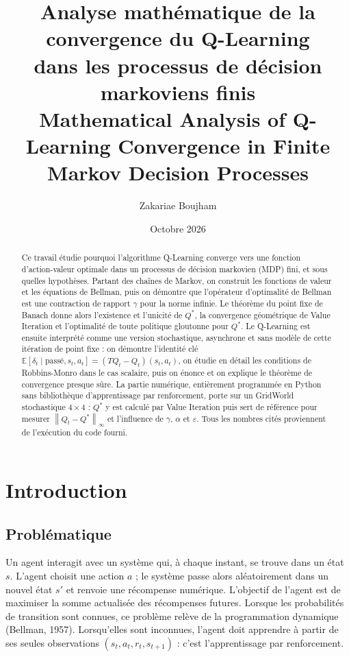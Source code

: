 \documentclass[11pt,a4paper]{article}
\title{\textbf{Analyse mathématique de la convergence du Q-Learning\\ dans les processus de décision markoviens finis}\\[0.6em]
\large Mathematical Analysis of Q-Learning Convergence in Finite Markov Decision Processes}
\author{Zakariae Boujham}
\date{Octobre 2026}
\theoremstyle{plain}
\theoremstyle{definition}
\theoremstyle{remark}
\newcommand{\E}{\mathbb{E}}
\newcommand{\ninf}[1]{\left\lVert #1 \right\rVert_\infty}
\newcommand{\1}{\mathbf{1}}
\begin{document}
\maketitle

\begin{abstract}
Ce travail étudie pourquoi l'algorithme Q-Learning converge vers une fonction d'action-valeur optimale dans un processus de décision markovien (MDP) fini, et sous quelles hypothèses. Partant des chaînes de Markov, on construit les fonctions de valeur et les équations de Bellman, puis on démontre que l'opérateur d'optimalité de Bellman est une contraction de rapport $\gamma$ pour la norme infinie. Le théorème du point fixe de Banach donne alors l'existence et l'unicité de $Q^*$, la convergence géométrique de Value Iteration et l'optimalité de toute politique gloutonne pour $Q^*$. Le Q-Learning est ensuite interprété comme une version stochastique, asynchrone et sans modèle de cette itération de point fixe : on démontre l'identité clé $\E[\delta_t\mid\text{passé}, s_t,a_t]=(TQ_t-Q_t)(s_t,a_t)$, on étudie en détail les conditions de Robbins-Monro dans le cas scalaire, puis on énonce et on explique le théorème de convergence presque sûre. La partie numérique, entièrement programmée en Python sans bibliothèque d'apprentissage par renforcement, porte sur un GridWorld stochastique $4\times4$ : $Q^*$ y est calculé par Value Iteration puis sert de référence pour mesurer $\ninf{Q_t-Q^*}$ et l'influence de $\gamma$, $\alpha$ et $\varepsilon$. Tous les nombres cités proviennent de l'exécution du code fourni.
\end{abstract}

\tableofcontents
\newpage

\section{Introduction}

\subsection{Problématique}

Un agent interagit avec un système qui, à chaque instant, se trouve dans un état $s$. L'agent choisit une action $a$ ; le système passe alors aléatoirement dans un nouvel état $s'$ et renvoie une récompense numérique. L'objectif de l'agent est de maximiser la somme actualisée des récompenses futures. Lorsque les probabilités de transition sont connues, ce problème relève de la programmation dynamique (Bellman, 1957). Lorsqu'elles sont inconnues, l'agent doit apprendre à partir de ses seules observations $(s_t,a_t,r_t,s_{t+1})$ : c'est l'apprentissage par renforcement.
\end{document}
